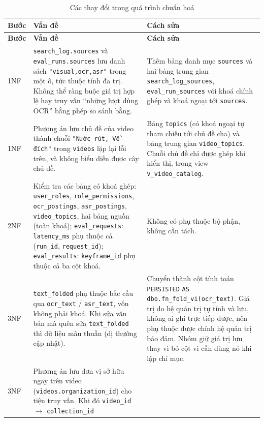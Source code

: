 {\renewcommand{\arraystretch}{1.25}
\begin{longtable}{>{\raggedright\arraybackslash}p{1.4cm} >{\raggedright\arraybackslash}p{6.5cm} >{\raggedright\arraybackslash}p{6.5cm}}
\caption{Các thay đổi trong quá trình chuẩn hoá}\label{tab:normalization}\\
\toprule
\textbf{Bước} & \textbf{Vấn đề} & \textbf{Cách sửa} \\
\midrule \endfirsthead
\toprule
\textbf{Bước} & \textbf{Vấn đề} & \textbf{Cách sửa} \\
\midrule \endhead
\bottomrule \endfoot
1NF & \texttt{search\_log.sources} và \texttt{eval\_runs.sources} lưu danh sách
\texttt{"visual,ocr,asr"} trong một ô, tức thuộc tính đa trị. Không thể ràng buộc giá trị
hợp lệ hay truy vấn ``những lượt dùng OCR'' bằng phép so sánh bằng. &
Thêm bảng danh mục \texttt{sources} và hai bảng trung gian \texttt{search\_log\_sources},
\texttt{eval\_run\_sources} với khoá chính ghép và khoá ngoại tới \texttt{sources}. \\
\addlinespace
1NF & Phương án lưu chủ đề của video thành chuỗi \texttt{"Nước rút, Về đích"} trong
\texttt{videos} lặp lại lỗi trên, và không biểu diễn được cây chủ đề. &
Bảng \texttt{topics} (có khoá ngoại tự tham chiếu tới chủ đề cha) và bảng trung gian
\texttt{video\_topics}. Chuỗi chủ đề chỉ được ghép khi hiển thị, trong view
\texttt{v\_video\_catalog}. \\
\addlinespace
2NF & Kiểm tra các bảng có khoá ghép: \texttt{user\_roles}, \texttt{role\_permissions},
\texttt{ocr\_postings}, \texttt{asr\_postings}, \texttt{video\_topics}, hai bảng nguồn (toàn
khoá); \texttt{eval\_requests}: \texttt{latency\_ms} phụ thuộc cả (\texttt{run\_id},
\texttt{request\_id}); \texttt{eval\_results}: \texttt{keyframe\_id} phụ thuộc cả ba cột khoá. &
Không có phụ thuộc bộ phận, không cần tách. \\
\addlinespace
3NF & \texttt{text\_folded} phụ thuộc bắc cầu qua \texttt{ocr\_text} /
\texttt{asr\_text}, vốn không phải khoá. Khi sửa văn bản mà quên sửa
\texttt{text\_folded} thì dữ liệu mâu thuẫn (dị thường cập nhật). &
Chuyển thành cột tính toán \texttt{PERSISTED} \texttt{AS dbo.fn\_fold\_vi(ocr\_text)}.
Giá trị do hệ quản trị tự tính và lưu, không ai ghi trực tiếp được, nên phụ thuộc
được chính hệ quản trị bảo đảm. Nhóm giữ giá trị lưu thay vì bỏ cột vì cần dùng nó khi
lập chỉ mục. \\
\addlinespace
3NF & Phương án lưu đơn vị sở hữu ngay trên video (\texttt{videos.organization\_id}) cho
tiện truy vấn. Khi đó \texttt{video\_id} $\rightarrow$ \texttt{collection\_id}

\end{longtable}}

